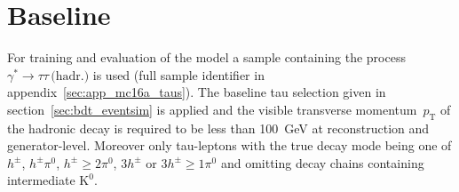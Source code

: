 

\section{Baseline}
\label{sec:pfo_baseline}

For training and evaluation of the model a sample containing the process
$\gamma^* \rightarrow \tau \tau \, \text{(hadr.)}$ is used (full sample
identifier in appendix~\ref{sec:app_mc16a_taus}). The baseline tau selection
given in section~\ref{sec:bdt_eventsim} is applied and the visible transverse
momentum~$p_\text{T}$ of the hadronic decay is required to be less than
\SI{100}{\giga\electronvolt} at reconstruction and generator-level. Moreover
only tau-leptons with the true decay mode being one of $h^\pm$, $h^\pm \pi^0$,
$h^\pm \geq 2\pi^0$, $3h^\pm$ or $3h^\pm \geq 1\pi^0$ and omitting decay chains
containing intermediate $\text{K}^0$.

